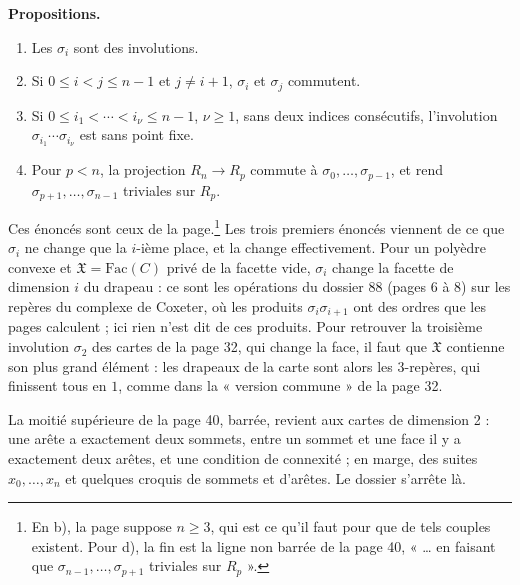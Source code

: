 \documentclass[11pt,a4paper]{article}
\begin{document}
\textbf{Propositions.}
\begin{enumerate}
\item[a)] Les $\sigma_{i}$ sont des involutions.
\item[b)] Si $0 \leq i < j \leq n - 1$ et $j \neq i + 1$, $\sigma_{i}$ et
$\sigma_{j}$ commutent.
\item[c)] Si $0 \leq i_{1} < \cdots < i_{\nu} \leq n - 1$, $\nu \geq 1$, sans deux
indices consécutifs, l'involution $\sigma_{i_{1}} \cdots \sigma_{i_{\nu}}$ est
sans point fixe.
\item[d)] Pour $p < n$, la projection $R_{n} \to R_{p}$ commute à
$\sigma_{0}, \ldots, \sigma_{p-1}$, et rend $\sigma_{p+1}, \ldots, \sigma_{n-1}$
triviales sur $R_{p}$.
\end{enumerate}
Ces énoncés sont ceux de la page.\footnote{En b), la page suppose $n \geq 3$, qui est ce qu'il faut pour que de
tels couples existent. Pour d), la fin est la ligne non barrée de la page 40,
« … en faisant que $\sigma_{n-1}, \ldots, \sigma_{p+1}$ triviales sur $R_{p}$ ».}
Les trois premiers énoncés viennent de ce que $\sigma_{i}$ ne change que la
$i$-ième place, et la change effectivement. Pour un polyèdre convexe et
$\mathfrak{X} = \mathrm{Fac}(C)$ privé de la facette vide, $\sigma_{i}$ change la
facette de dimension $i$ du drapeau : ce sont les opérations du dossier 88
(pages 6 à 8) sur les repères du complexe de Coxeter, où les produits
$\sigma_{i}\sigma_{i+1}$ ont des ordres que les pages calculent ; ici rien n'est
dit de ces produits. Pour retrouver la troisième involution $\sigma_{2}$ des
cartes de la page 32, qui change la face, il faut que $\mathfrak{X}$ contienne
son plus grand élément : les drapeaux de la carte sont alors les $3$-repères,
qui finissent tous en $1$, comme dans la « version commune » de la page 32.

La moitié supérieure de la page 40, barrée, revient aux cartes de dimension 2 :
une arête a exactement deux sommets, entre un sommet et une face il y a
exactement deux arêtes, et une condition de connexité ; en marge, des suites
$x_{0}, \ldots, x_{n}$ et quelques croquis de sommets et d'arêtes. Le dossier
s'arrête là.
\end{document}
